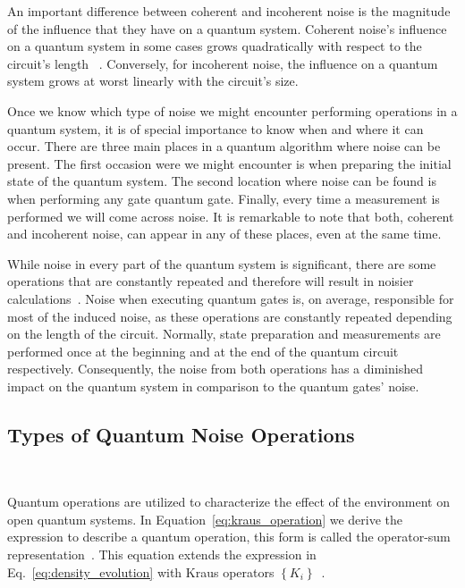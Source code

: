 An important difference between coherent and incoherent noise is the
magnitude of the influence that they have on a quantum system.
Coherent noise's influence on a quantum system in some cases grows
quadratically with respect to the circuit's length
~\cite{iverson_coherence_2020}. Conversely, for incoherent noise,
the influence on a quantum system grows at worst linearly with the
circuit's size. \

Once we know which type of noise we might encounter performing operations
in a quantum system, it is of special importance to know when and where
it can occur. There are three main places in a quantum algorithm where
noise can be present. The first occasion were we might encounter is when
preparing the initial state of the quantum system. The second location
where noise can be found is when performing any gate quantum gate.
Finally, every time a measurement is performed we will come across noise.
It is remarkable to note that both, coherent and incoherent noise, can
appear in any of these places, even at the same time. \

While noise in every part of the quantum system is significant, there
are some operations that are constantly repeated and therefore will result
in noisier calculations~\cite{resch_benchmarking_2022}. Noise when executing quantum gates
is, on average, responsible for most of the induced noise, as these
operations are constantly repeated depending on the length of the circuit. 
Normally, state preparation and measurements are performed once at the
beginning and at the end of the quantum circuit respectively. Consequently,
the noise from both operations has a diminished impact on the quantum
system in comparison to the quantum gates' noise. \ 

\subsection{Types of Quantum Noise Operations}\label{subsection:operation_types} \

Quantum operations are utilized to characterize the effect of the
environment on open quantum systems. In Equation~\ref{eq:kraus_operation}
we derive the expression to describe a quantum operation, this form is
called the operator-sum representation~\cite{breuer_theory_2007}. This equation extends
the expression in Eq.~\ref{eq:density_evolution} with Kraus operators
\(\left\{K_i\right\}\)~\cite{kraus_general_1971}. \


